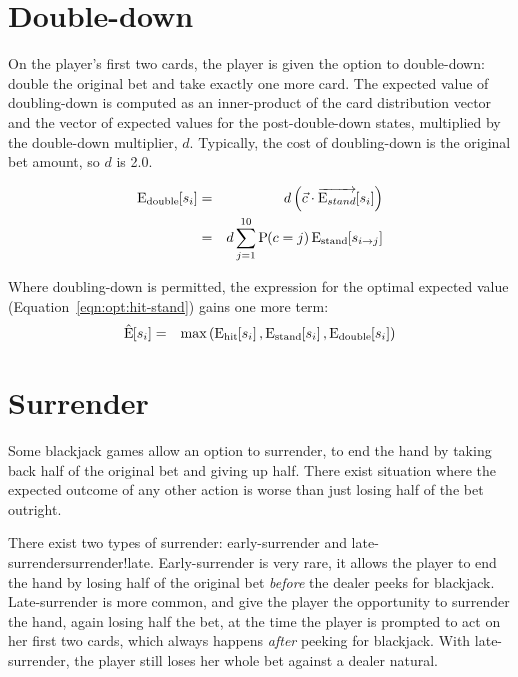 \section{Double-down}
\label{sec:basic:double}

On the player's first two cards, the player is given the option to
double-down: double the original bet and take exactly one more card.
The expected value of doubling-down is computed as an inner-product
of the card distribution vector and the vector of expected values for the
post-double-down states, multiplied by the double-down multiplier, $d$.
Typically, the cost of doubling-down is the original bet amount, 
so $d$ is 2.0.

\begin{eqnarray}
\textrm{E}_{\textrm{double}}\hspace{-.5ex}\left[s_i\right] &=& d \left(\vec{c}\cdot \overrightarrow{\textrm{E}_{stand}}\hspace{-.5ex}\left[s_i\right]\right) \nonumber \\
&=& d \sum_{j=1}^{10}{\textrm{P}\hspace{-.5ex}\left(c=j\right)\textrm{E}_{\textrm{stand}}\hspace{-.5ex}\left[s_{i\rightarrow{}j}\right]}
\end{eqnarray}

Where doubling-down is permitted, the expression for the
optimal expected value (Equation~\ref{eqn:opt:hit-stand}) gains one more term:
\begin{eqnarray}
\hat{\textrm{E}}\hspace{-.5ex}\left[s_i\right] &=& \textrm{max}\left(\textrm{E}_{\textrm{hit}}\hspace{-.5ex}\left[s_i\right],\textrm{E}_{\textrm{stand}}\hspace{-.5ex}\left[s_i\right],\textrm{E}_{\textrm{double}}\hspace{-.5ex}\left[s_i\right]\right) \label{eqn:opt:hit-stand-dbl}
\end{eqnarray}

\section{Surrender}
\label{sec:basic:surrender}

Some blackjack games allow an option to surrender, 
to end the hand by taking back half of the original
bet and giving up half.
There exist situation where the expected outcome of any other action 
is worse than just losing half of the bet outright.  

There exist two types of surrender:
early-surrender and late-surrender{surrender!late}.
Early-surrender is very rare, it allows the player to 
end the hand by losing half of the original bet \emph{before}
the dealer peeks for blackjack.
Late-surrender is more common, and give the player the opportunity to
surrender the hand, again losing half the bet, 
at the time the player is prompted to act on her first two cards, 
which always happens \emph{after} peeking for blackjack.  
With late-surrender, the player still loses her whole bet against 
a dealer natural.

